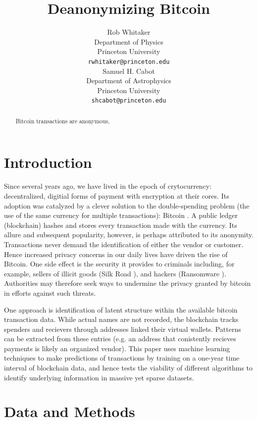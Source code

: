 \documentclass{article} %
\title{Deanonymizing Bitcoin}
\author{
Rob Whitaker\\
Department of Physics\\
Princeton University\\
\texttt{rwhitaker@princeton.edu} \\
\And
Samuel H. Cabot \\
Department of Astrophysics\\
Princeton University \\
\texttt{shcabot@princeton.edu} \\
}
\begin{document}
\setlength{\belowcaptionskip}{-10pt}

\maketitle

\begin{abstract}
Bitcoin transactions are anonymous, 

\end{abstract}

\section{Introduction}

Since several years ago, we have lived in the epoch of crytocurrency: decentralized, digitial forms of payment with encryption at their cores. Its adoption was catalyzed by a clever solution to the double-spending problem (the use of the same currency for multiple transactions): Bitcoin \cite{Nakamoto2008}. A public ledger (blockchain) hashes and stores every transaction made with the currency. Its allure and subsequent popularity, however, is perhaps attributed to its anonymity. Transactions never demand the identification of either the vendor or customer. Hence increased privacy concerns in our daily lives have driven the rise of Bitcoin. One side effect is the security it provides to criminals including, for example, sellers of illicit goods (Silk Road \cite{Christin2013}), and hackers (Ransomware \cite{Pathak2016}). Authorities may therefore seek ways to undermine the privacy granted by bitcoin in efforts against such threats.

One approach is identification of latent structure within the available bitcoin transaction data. While actual names are not recorded, the blockchain tracks spenders and recievers through addresses linked their virtual wallets. Patterns can be extracted from these entries (e.g. an address that conistently recieves payments is likely an organized vendor). This paper uses machine learning techniques to make predictions of transactions by training on a one-year time interval of blockchain data, and hence tests the viability of different algorithms to identify underlying information in massive yet sparse datasets.

\section{Data and Methods}
\end{document}
